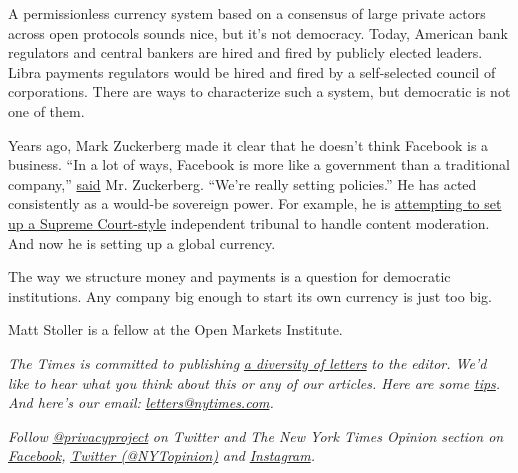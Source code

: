A permissionless currency system based on a consensus of large private
actors across open protocols sounds nice, but it's not democracy. Today,
American bank regulators and central bankers are hired and fired by
publicly elected leaders. Libra payments regulators would be hired and
fired by a self-selected council of corporations. There are ways to
characterize such a system, but democratic is not one of them.

Years ago, Mark Zuckerberg made it clear that he doesn't think Facebook
is a business. ``In a lot of ways, Facebook is more like a government
than a traditional company,''
\href{https://books.google.com/books?id=n1g1DwAAQBAJ\&pg=PA61\&dq=\%E2\%80\%9CIn+a+lot+of+ways,+Facebook+is+more+like+a+government+than+a+traditional+company\%E2\%80\%9D+Foer\&hl=en\&sa=X\&ved=0ahUKEwiAvO-pi_TiAhXlkOAKHX2jCzYQ6AEIMDAB\#v=onepage\&q=\%E2\%80\%9CIn\%20a\%20lot\%20of\%20ways\%2C\%20Facebook\%20is\%20more\%20like\%20a\%20government\%20than\%20a\%20traditional\%20company\%E2\%80\%9D\%20Foer\&f=false}{said}
Mr. Zuckerberg. ``We're really setting policies.'' He has acted
consistently as a would-be sovereign power. For example, he is
\href{https://www.nytimes.com/2018/11/17/opinion/facebook-supreme-court-speech.html}{attempting
to set up a Supreme Court-style} independent tribunal to handle content
moderation. And now he is setting up a global currency.

The way we structure money and payments is a question for democratic
institutions. Any company big enough to start its own currency is just
too big.

Matt Stoller is a fellow at the Open Markets Institute.

\emph{The Times is committed to publishing}
\href{https://www.nytimes.com/2019/01/31/opinion/letters/letters-to-editor-new-york-times-women.html}{\emph{a
diversity of letters}} \emph{to the editor. We'd like to hear what you
think about this or any of our articles. Here are some}
\href{https://help.nytimes.com/hc/en-us/articles/115014925288-How-to-submit-a-letter-to-the-editor}{\emph{tips}}\emph{.
And here's our email:}
\href{mailto:letters@nytimes.com}{\emph{letters@nytimes.com}}\emph{.}

\emph{Follow}
\href{https://twitter.com/privacyproject}{\emph{@privacyproject}}
\emph{on Twitter and The New York Times Opinion section on}
\href{https://www.facebook.com/nytopinion}{\emph{Facebook}}\emph{,}
\href{http://twitter.com/NYTOpinion}{\emph{Twitter (@NYTopinion)}}
\emph{and}
\href{https://www.instagram.com/nytopinion/}{\emph{Instagram}}\emph{.}

